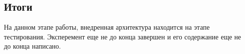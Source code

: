 \subsection{Итоги}
На данном этапе работы, внедренная архитектура находится на этапе тестирования. Эксперемент еще не до конца завершен и его содержание еще не до конца написано.

%
%
